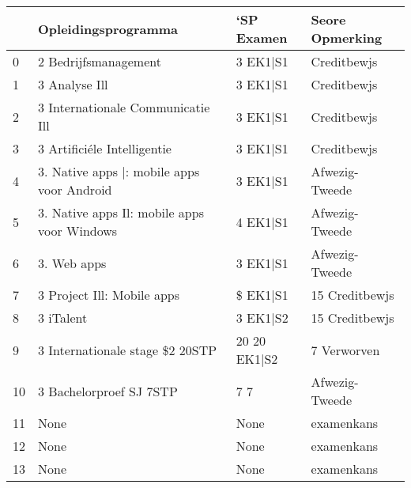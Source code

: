 \begin{tabular}{llll}
\toprule
{} &                          Opleidingsprogramma &    ‘SP Examen &  Seore Opmerking \\
\midrule
0  &                         2 Bedrijfsmanagement &      3 EK1|S1 &      Creditbewjs \\
1  &                                3 Analyse Ill &      3 EK1|S1 &      Creditbewjs \\
2  &            3 Internationale Communicatie Ill &      3 EK1|S1 &      Creditbewjs \\
3  &                  3 Artificiéle Intelligentie &      3 EK1|S1 &      Creditbewjs \\
4  &   3. Native apps |: mobile apps voor Android &      3 EK1|S1 &  Afwezig- Tweede \\
5  &  3. Native apps Il: mobile apps voor Windows &      4 EK1|S1 &  Afwezig- Tweede \\
6  &                                  3. Web apps &      3 EK1|S1 &  Afwezig- Tweede \\
7  &                   3 Project Ill: Mobile apps &      \$ EK1|S1 &   15 Creditbewjs \\
8  &                                    3 iTalent &      3 EK1|S2 &   15 Creditbewjs \\
9  &              3 Internationale stage \$2 20STP &  20 20 EK1|S2 &      7 Verworven \\
10 &                      3 Bachelorproef SJ 7STP &           7 7 &  Afwezig- Tweede \\
11 &                                         None &          None &       examenkans \\
12 &                                         None &          None &       examenkans \\
13 &                                         None &          None &       examenkans \\
\bottomrule
\end{tabular}
